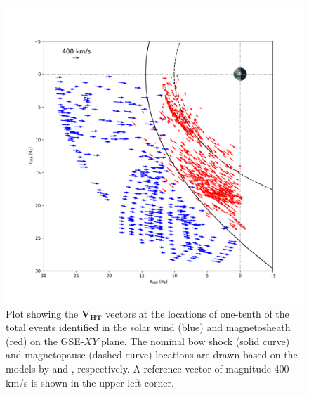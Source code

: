 \begin{figure}
    \centering
    \includegraphics[width=\textwidth]{Figures/Orbits/VHT_xy.png}
    \caption[Orbit plot of flow vectors associated with the SFRs]{Plot showing the $\mathbf{V_{HT}}$ vectors at the locations of one-tenth of the total events identified in the solar wind (blue) and magnetosheath (red) on the GSE-$XY$ plane. The nominal bow shock (solid curve) and magnetopause (dashed curve) locations are drawn based on the models by \citet{Shue:1997} and \citet{SlavinHolzer:1984}, respectively. A reference vector of magnitude 400 km/s is shown in the upper left corner.}
    \label{fig:VHT-xy}
\end{figure}


